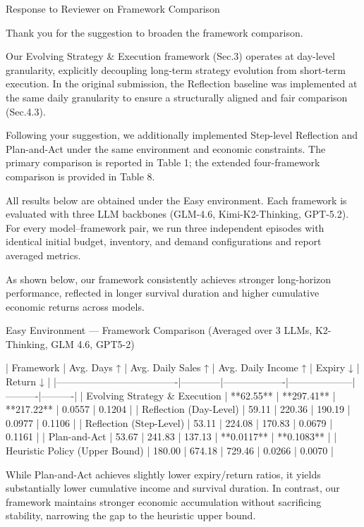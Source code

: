 Response to Reviewer on Framework Comparison

Thank you for the suggestion to broaden the framework comparison.

Our Evolving Strategy & Execution framework (Sec.3) operates at day-level granularity, explicitly decoupling long-term strategy evolution from short-term execution. In the original submission, the Reflection baseline was implemented at the same daily granularity to ensure a structurally aligned and fair comparison (Sec.4.3).

Following your suggestion, we additionally implemented Step-level Reflection and Plan-and-Act under the same environment and economic constraints. The primary comparison is reported in Table 1; the extended four-framework comparison is provided in Table 8.

All results below are obtained under the Easy environment. Each framework is evaluated with three LLM backbones (GLM-4.6, Kimi-K2-Thinking, GPT-5.2). For every model–framework pair, we run three independent episodes with identical initial budget, inventory, and demand configurations and report averaged metrics.

As shown below, our framework consistently achieves stronger long-horizon performance, reflected in longer survival duration and higher cumulative economic returns across models.

Easy Environment — Framework Comparison (Averaged over 3 LLMs, K2-Thinking, GLM 4.6, GPT5-2)

| Framework                          | Avg. Days ↑ | Avg. Daily Sales ↑ | Avg. Daily Income ↑ | Expiry ↓ | Return ↓ |
|-------------------------------------|------------|-------------------|--------------------|----------|----------|
| Evolving Strategy & Execution       | **62.55**  | **297.41**        | **217.22**         | 0.0557   | 0.1204   |
| Reflection (Day-Level)              | 59.11      | 220.36            | 190.19             | 0.0977   | 0.1106   |
| Reflection (Step-Level)             | 53.11      | 224.08            | 170.83             | 0.0679   | 0.1161   |
| Plan-and-Act                        | 53.67      | 241.83            | 137.13             | **0.0117** | **0.1083** |
| Heuristic Policy (Upper Bound)      | 180.00     | 674.18            | 729.46             | 0.0266   | 0.0070   |

While Plan-and-Act achieves slightly lower expiry/return ratios, it yields substantially lower cumulative income and survival duration. In contrast, our framework maintains stronger economic accumulation without sacrificing stability, narrowing the gap to the heuristic upper bound.

